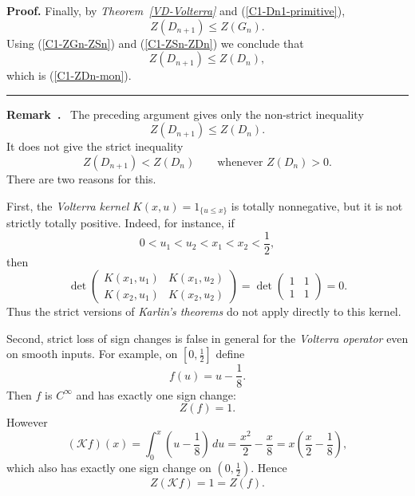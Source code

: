 \documentclass[onecolumn]{article}
\newenvironment{remark}{  \refstepcounter{theorem}  \par\medskip\noindent\textbf{Remark~\thetheorem.}\rmfamily\ }{\par\medskip}
\newenvironment{proof}[1][Proof]{\noindent\textbf{#1.} }{\ \rule{0.5em}{0.5em}}
\begin{document}
\begin{proof}
Finally, by \textit{Theorem~\ref{VD-Volterra}} and (\ref{C1-Dn1-primitive}), 
\begin{equation}
Z(D_{n+1})\leq Z(G_{n}).  \label{1340}
\end{equation}%
Using (\ref{C1-ZGn-ZSn}) and (\ref{C1-ZSn-ZDn}) we conclude that 
\begin{equation}
Z(D_{n+1})\leq Z(D_{n}),  \label{1341}
\end{equation}%
which is (\ref{C1-ZDn-mon}). \hfill
\end{proof}

\begin{remark}
\label{no-strict-from-kernel} The preceding argument gives only the
non-strict inequality 
\begin{equation}
Z(D_{n+1})\leq Z(D_{n}).  \label{1342}
\end{equation}%
It does not give the strict inequality 
\begin{equation}
Z(D_{n+1})<Z(D_{n})\qquad \text{whenever }Z(D_{n})>0.  \label{1343}
\end{equation}%
There are two reasons for this.

First, the \textit{Volterra kernel} $K(x,u)=1_{\{u\leq x\}}$ is totally
nonnegative, but it is not strictly totally positive. Indeed, for instance,
if 
\begin{equation}
0<u_{1}<u_{2}<x_{1}<x_{2}<\frac{1}{2},  \label{1344}
\end{equation}%
then 
\begin{equation}
\det 
\begin{pmatrix}
K(x_{1},u_{1}) & K(x_{1},u_{2}) \\ 
K(x_{2},u_{1}) & K(x_{2},u_{2})%
\end{pmatrix}%
=\det 
\begin{pmatrix}
1 & 1 \\ 
1 & 1%
\end{pmatrix}%
=0.  \label{1345}
\end{equation}%
Thus the strict versions of \textit{Karlin's theorems} do not apply directly
to this kernel.

Second, strict loss of sign changes is false in general for the \textit{%
Volterra operator} even on smooth inputs. For example, on $[0,\tfrac{1}{2}]$
define 
\begin{equation}
f(u)=u-\frac{1}{8}.  \label{1346}
\end{equation}%
Then $f$ is $C^{\infty }$ and has exactly one sign change: 
\begin{equation}
Z(f)=1.  \label{1347}
\end{equation}%
However 
\begin{equation}
(\mathcal{K}f)(x)=\int_{0}^{x}\left( u-\frac{1}{8}\right) \,du=\frac{x^{2}}{2%
}-\frac{x}{8}=x\left( \frac{x}{2}-\frac{1}{8}\right) ,  \label{1348}
\end{equation}%
which also has exactly one sign change on $(0,\tfrac{1}{2})$. Hence 
\begin{equation}
Z(\mathcal{K}f)=1=Z(f).  \label{1349}
\end{equation}


\end{remark}
\end{document}
